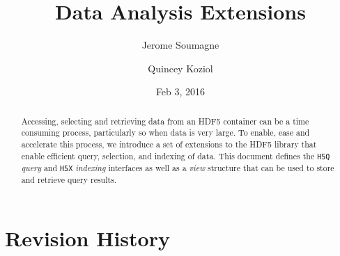 \documentclass[letterpaper,hyper]{THG_RFC}
\title{Data Analysis Extensions}
\author{Jerome Soumagne}
\author{Quincey Koziol}
\date{Feb 3, 2016}
\begin{document}
\maketitle

\begin{abstract}
Accessing, selecting and retrieving data from an HDF5 container can be a time
consuming process, particularly so when data is very large. To enable, ease and 
accelerate this process, we introduce a set of extensions to the HDF5 library
that enable efficient query, selection, and indexing of data. This document defines
the \texttt{H5Q} \textit{query} and \texttt{H5X} \textit{indexing} interfaces as
well as a \textit{view} structure that can be used to store and retrieve query results.
\end{abstract}



\section*{Revision History}
\makerevisions



\end{document}
